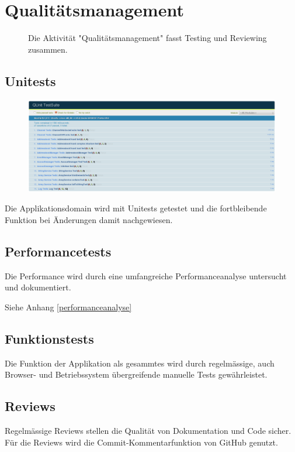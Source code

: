 \chapter{Qualitätsmanagement}
	\begin{figure}[H]
		\centering
		{\tiny
		}
		\caption{Die Aktivität "Qualitätsmanagement" fasst Testing und Reviewing zusammen.}
	\end{figure}


	\section{Unitests}		
		\begin{figure}[H]
			\centering
			\includegraphics[width=1\textwidth]{../qualityManagement/unittesting.png}
			\label{unittests}
		\end{figure}
		Die Applikationsdomain wird mit Unitests getestet und die fortbleibende Funktion bei Änderungen damit nachgewiesen.
		
	\section{Performancetests}
		Die Performance wird durch eine umfangreiche Performanceanalyse untersucht und dokumentiert.
		
		Siehe Anhang \ref{performanceanalyse}
		
	\section{Funktionstests}
		Die Funktion der Applikation als gesammtes wird durch regelmässige, auch Browser- und Betriebssystem übergreifende manuelle Tests gewährleistet.
		
	\section{Reviews}
		Regelmässige Reviews stellen die Qualität von Dokumentation und Code sicher. Für die Reviews wird die Commit-Kommentarfunktion von GitHub genutzt.
